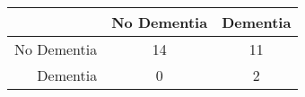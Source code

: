 \begin{table}[ht]
\centering
\begin{tabular}{r|c|c}
  \hline
 & No Dementia & Dementia \\ 
  \hline
No Dementia & 14 & 11 \\ 
  Dementia & 0 & 2 \\ 
   \hline
\end{tabular}
\end{table}
